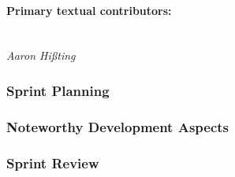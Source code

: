 \paragraph{Primary textual contributors:}
\mbox{}\\\emph{Aaron Hißting}

\subsubsection{Sprint Planning}


\subsubsection{Noteworthy Development Aspects}


\subsubsection{Sprint Review}
